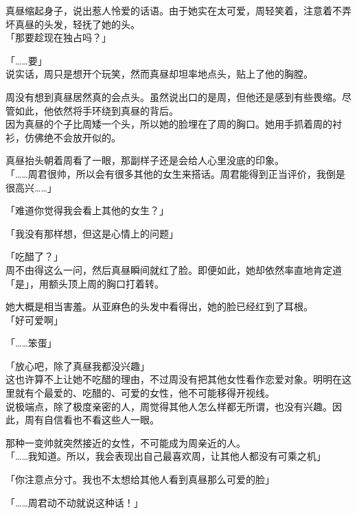真昼缩起身子，说出惹人怜爱的话语。由于她实在太可爱，周轻笑着，注意着不弄坏真昼的头发，轻抚了她的头。\\

「那要趁现在独占吗？」

「……要」\\

说实话，周只是想开个玩笑，然而真昼却坦率地点头，贴上了他的胸膛。

周没有想到真昼居然真的会点头。虽然说出口的是周，但他还是感到有些畏缩。尽管如此，他依然将手环绕到真昼的背后。\\

因为真昼的个子比周矮一个头，所以她的脸埋在了周的胸口。她用手抓着周的衬衫，仿佛绝不会放开似的。

真昼抬头朝着周看了一眼，那副样子还是会给人心里没底的印象。\\

「……周君很帅，所以会有很多其他的女生来搭话。周君能得到正当评价，我倒是很高兴……」

「难道你觉得我会看上其他的女生？」

「我没有那样想，但这是心情上的问题」

「吃醋了？」\\

周不由得这么一问，然后真昼瞬间就红了脸。即便如此，她却依然率直地肯定道「是」，用额头顶上周的胸口打着转。

她大概是相当害羞。从亚麻色的头发中看得出，她的脸已经红到了耳根。\\

「好可爱啊」

「……笨蛋」

「放心吧，除了真昼我都没兴趣」\\

这也许算不上让她不吃醋的理由，不过周没有把其他女性看作恋爱对象。明明在这里就有个最爱的、吃醋的、可爱的女性，他不可能移得开视线。\\

说极端点，除了极度亲密的人，周觉得其他人怎么样都无所谓，也没有兴趣。因此，周有自信看也不看这些人一眼。

那种一变帅就突然接近的女性，不可能成为周亲近的人。\\

「……我知道。所以，我会表现出自己最喜欢周，让其他人都没有可乘之机」

「你注意点分寸。我也不太想给其他人看到真昼那么可爱的脸」

「……周君动不动就说这种话！」\\

